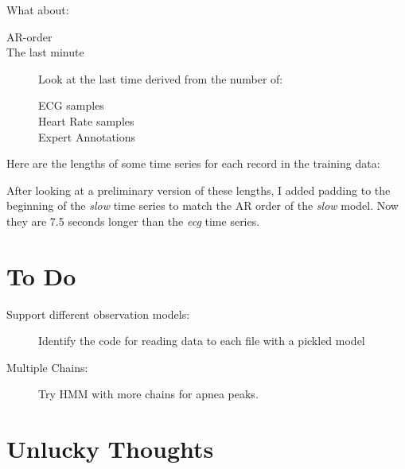 \documentclass[12pt]{article}
\begin{document}
What about:
\begin{description}
\item[AR-order] 
\item[The last minute] Look at the last time derived from the number of:
  \begin{description}
  \item[ECG samples] 
  \item[Heart Rate samples] 
  \item[Expert Annotations] 
  \end{description}
\end{description}

Here are the lengths of some time series for each record in the
training data:



After looking at a preliminary version of these lengths, I added
padding to the beginning of the \emph{slow} time series to match the
AR order of the \emph{slow} model.  Now they are 7.5 seconds longer
than the \emph{ecg} time series.

\section{To Do}
\label{sec:todo}

\begin{description}
\item[Support different observation models:] Identify the code for
  reading data to each file with a pickled model
\item[Multiple Chains:] Try HMM with more chains for apnea peaks.
\end{description}

\section{Unlucky Thoughts}
\label{sec:unlucky}
\end{document}
